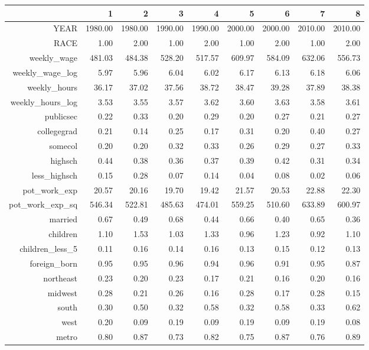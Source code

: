 \begin{table}[ht]
\centering
\begin{tabular}{rrrrrrrrr}
  \hline
 & 1 & 2 & 3 & 4 & 5 & 6 & 7 & 8 \\ 
  \hline
YEAR & 1980.00 & 1980.00 & 1990.00 & 1990.00 & 2000.00 & 2000.00 & 2010.00 & 2010.00 \\ 
  RACE & 1.00 & 2.00 & 1.00 & 2.00 & 1.00 & 2.00 & 1.00 & 2.00 \\ 
  weekly\_wage & 481.03 & 484.38 & 528.20 & 517.57 & 609.97 & 584.09 & 632.06 & 556.73 \\ 
  weekly\_wage\_log & 5.97 & 5.96 & 6.04 & 6.02 & 6.17 & 6.13 & 6.18 & 6.06 \\ 
  weekly\_hours & 36.17 & 37.02 & 37.56 & 38.72 & 38.47 & 39.28 & 37.89 & 38.38 \\ 
  weekly\_hours\_log & 3.53 & 3.55 & 3.57 & 3.62 & 3.60 & 3.63 & 3.58 & 3.61 \\ 
  publicsec & 0.22 & 0.33 & 0.20 & 0.29 & 0.20 & 0.27 & 0.21 & 0.27 \\ 
  collegegrad & 0.21 & 0.14 & 0.25 & 0.17 & 0.31 & 0.20 & 0.40 & 0.27 \\ 
  somecol & 0.20 & 0.20 & 0.32 & 0.33 & 0.26 & 0.29 & 0.27 & 0.33 \\ 
  highsch & 0.44 & 0.38 & 0.36 & 0.37 & 0.39 & 0.42 & 0.31 & 0.34 \\ 
  less\_highsch & 0.15 & 0.28 & 0.07 & 0.14 & 0.04 & 0.08 & 0.02 & 0.06 \\ 
  pot\_work\_exp & 20.57 & 20.16 & 19.70 & 19.42 & 21.57 & 20.53 & 22.88 & 22.30 \\ 
  pot\_work\_exp\_sq & 546.34 & 522.81 & 485.63 & 474.01 & 559.25 & 510.60 & 633.89 & 600.97 \\ 
  married & 0.67 & 0.49 & 0.68 & 0.44 & 0.66 & 0.40 & 0.65 & 0.36 \\ 
  children & 1.10 & 1.53 & 1.03 & 1.33 & 0.96 & 1.23 & 0.92 & 1.10 \\ 
  children\_less\_5 & 0.11 & 0.16 & 0.14 & 0.16 & 0.13 & 0.15 & 0.12 & 0.13 \\ 
  foreign\_born & 0.95 & 0.95 & 0.96 & 0.94 & 0.96 & 0.91 & 0.95 & 0.87 \\ 
  northeast & 0.23 & 0.20 & 0.23 & 0.17 & 0.21 & 0.16 & 0.20 & 0.16 \\ 
  midwest & 0.28 & 0.21 & 0.26 & 0.16 & 0.28 & 0.17 & 0.28 & 0.15 \\ 
  south & 0.30 & 0.50 & 0.32 & 0.58 & 0.32 & 0.58 & 0.33 & 0.62 \\ 
  west & 0.20 & 0.09 & 0.19 & 0.09 & 0.19 & 0.09 & 0.19 & 0.08 \\ 
  metro & 0.80 & 0.87 & 0.73 & 0.82 & 0.75 & 0.87 & 0.76 & 0.89 \\ 
   \hline
\end{tabular}
\end{table}
